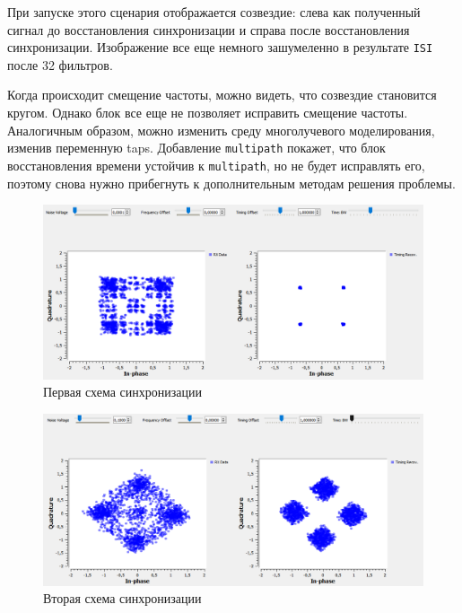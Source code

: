 \documentclass[a4paper]{article}
\begin{document}
            При запуске этого сценария отображается созвездие: слева как полученный сигнал до восстановления синхронизации и справа после восстановления синхронизации. Изображение все еще немного зашумеленно в результате \texttt{ISI} после 32 фильтров.
            
            Когда происходит смещение частоты, можно видеть, что созвездие становится кругом. Однако блок все еще не позволяет исправить смещение частоты. Аналогичным образом, можно изменить среду многолучевого моделирования, изменив переменную taps. Добавление \texttt{multipath} покажет, что блок восстановления времени устойчив к \texttt{multipath}, но не будет исправлять его, поэтому снова нужно прибегнуть к дополнительным методам решения проблемы.
            
            \begin{figure}[H]
                \centering
                \includegraphics[width=\textwidth]{img/p4_2.png}
                \caption{Первая схема синхронизации}
                \label{fig:p4_2}
            \end{figure}
            
            \begin{figure}[H]
                \centering
                \includegraphics[width=\textwidth]{img/p4_3.png}
                \caption{Вторая схема синхронизации}
                \label{fig:p4_3}
            \end{figure}
            
\end{document}
